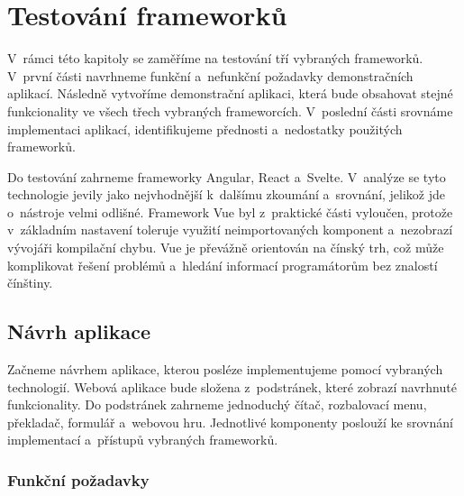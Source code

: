 \section{Testování frameworků}

V~rámci této kapitoly se zaměříme na testování tří vybraných frameworků. V~první části navrhneme funkční a~nefunkční požadavky demonstračních aplikací. 
Následně vytvoříme demonstrační aplikaci, která bude obsahovat stejné funkcionality ve všech třech vybraných frameworcích. 
V~poslední části srovnáme implementaci aplikací, identifikujeme přednosti a~nedostatky použitých frameworků.

Do testování zahrneme frameworky Angular, React a~Svelte. V~analýze se tyto technologie jevily jako nejvhodnější k~dalšímu zkoumání a~srovnání, jelikož jde o~nástroje velmi odlišné. 
Framework Vue byl z~praktické části vyloučen, protože v~základním nastavení toleruje využití neimportovaných komponent a~nezobrazí vývojáři kompilační chybu. 
Vue je převážně orientován na čínský trh, což může komplikovat řešení problémů a~hledání informací programátorům bez znalostí čínštiny.

\subsection{Návrh aplikace}

Začneme návrhem aplikace, kterou posléze implementujeme pomocí vybraných technologií. 
Webová aplikace bude složena z~podstránek, které zobrazí navrhnuté funkcionality. 
Do podstránek zahrneme jednoduchý čítač, rozbalovací menu, překladač, formulář a~webovou hru. 
Jednotlivé komponenty poslouží ke srovnání implementací a~přístupů vybraných frameworků.

\subsubsection{Funkční požadavky}

